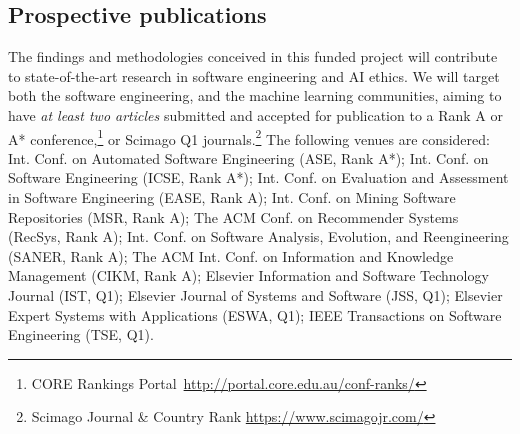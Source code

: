 


\subsection{Prospective publications}


The findings and methodologies conceived in this funded project will contribute to state-of-the-art research in software engineering and AI ethics. %
We will target both the software engineering, and the machine learning communities, aiming to have \emph{at least two articles} submitted and accepted for publication to a Rank A or A* conference,\footnote{CORE Rankings Portal~\url{http://portal.core.edu.au/conf-ranks/}} or %
Scimago Q1 journals.\footnote{Scimago Journal \& Country Rank \url{https://www.scimagojr.com/}} %
The following venues are considered: Int. Conf. on Automated Software Engineering (ASE, Rank A*); Int. Conf. on Software Engineering (ICSE, Rank A*); Int. Conf. on Evaluation and Assessment in Software Engineering (EASE, Rank A); Int. Conf. on Mining Software Repositories (MSR, Rank A); The ACM Conf. on Recommender Systems (RecSys, Rank A); Int. Conf. on Software Analysis, Evolution, and Reengineering (SANER, Rank A); The ACM Int. Conf. on Information and Knowledge Management (CIKM, Rank A); Elsevier Information and Software Technology Journal (IST, Q1); Elsevier Journal of Systems and Software (JSS, Q1); Elsevier Expert Systems with Applications (ESWA, Q1); IEEE Transactions on Software Engineering (TSE, Q1).

